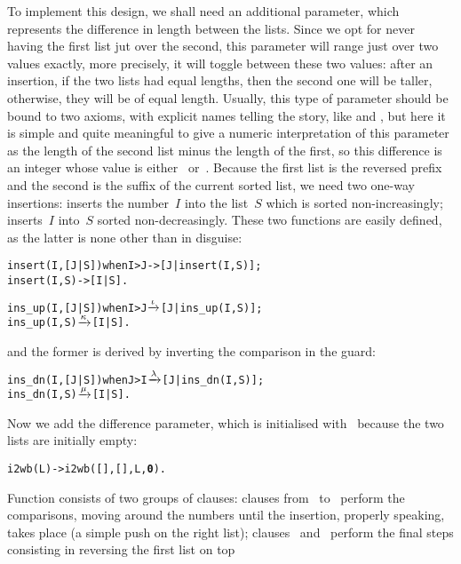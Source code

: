 To implement this design, we shall need an additional parameter, which
represents the difference in length between the lists. Since we opt
for never having the first list jut over the second, this parameter
will range just over two values exactly, more precisely, it will
toggle between these two values: after an insertion, if the two lists
had equal lengths, then the second one will be taller, otherwise, they
will be of equal length. Usually, this type of parameter should be
bound to two axioms, with explicit names telling the story, like
 and , but here it is simple and
quite meaningful to give a numeric interpretation of this parameter as
the length of the second list minus the length of the first, so this
difference is an integer whose value is either
~or~. Because the first list is the reversed
prefix and the second is the suffix of the current sorted list, we
need two one\hyp{}way insertions: 
inserts the number~\(I\) into the list~\(S\) which is sorted
non\hyp{}increasingly;  inserts~\(I\)
into~\(S\) sorted non\hyp{}decreasingly. These two functions are
easily defined, as the latter is none other than 
 in disguise:
\begin{alltt}
insert(I,[J|S]) when I > J -> [J|insert(I,S)];
insert(I,    S)            -> [I|S].

ins_up(I,[J|S]) when I > J \(\smashedrightarrow{\iota}\) [J|ins_up(I,S)];
ins_up(I,    S)            \(\smashedrightarrow{\kappa}\) [I|S].
\end{alltt}
and the former is derived by inverting the comparison in the guard:
\begin{alltt}
ins_dn(I,[J|S]) when J > I \(\smashedrightarrow{\lambda}\) [J|ins_dn(I,S)];
ins_dn(I,    S)            \(\smashedrightarrow{\mu}\) [I|S].
\end{alltt}
Now we add the difference parameter, which is initialised
with~ because the two lists are initially empty:
\begin{alltt}
i2wb(L) -> i2wb([],[],L,\textbf{0}).
\end{alltt}
Function   consists of
two groups of clauses: clauses from~\clause{\gamma}
to~\clause{\epsilon} perform the comparisons, moving around the
numbers until the insertion, properly speaking, takes place (a simple
push on the right list); clauses \clause{\alpha}~and~\clause{\beta}
perform the final steps consisting in reversing the first list on top
